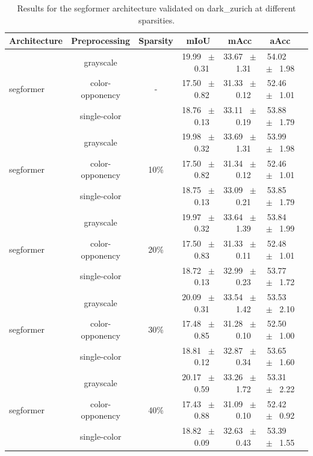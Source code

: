 \begin{table}[h]
  \centering
  \caption{Results for the segformer architecture validated on dark_zurich at different sparsities.}
  \begin{tabular}{@{}lccc ccc@{}}
    \toprule
    Architecture & Preprocessing & Sparsity & mIoU & mAcc & aAcc \\
    \midrule

    \multirow{3}{*}{segformer} & grayscale & \multirow{3}{*}{-} & 19.99 ~$\pm$~ 0.31 & 33.67 ~$\pm$~ 1.31 & 54.02 ~$\pm$~ 1.98 \\
    & color-opponency &  & 17.50 ~$\pm$~ 0.82 & 31.33 ~$\pm$~ 0.12 & 52.46 ~$\pm$~ 1.01 \\
    & single-color &  & 18.76 ~$\pm$~ 0.13 & 33.11 ~$\pm$~ 0.19 & 53.88 ~$\pm$~ 1.79 \\
    \midrule
    \multirow{3}{*}{segformer} & grayscale & \multirow{3}{*}{10\%} & 19.98 ~$\pm$~ 0.32 & 33.69 ~$\pm$~ 1.31 & 53.99 ~$\pm$~ 1.98 \\
    & color-opponency &  & 17.50 ~$\pm$~ 0.82 & 31.34 ~$\pm$~ 0.12 & 52.46 ~$\pm$~ 1.01 \\
    & single-color &  & 18.75 ~$\pm$~ 0.13 & 33.09 ~$\pm$~ 0.21 & 53.85 ~$\pm$~ 1.79 \\
    \midrule
    \multirow{3}{*}{segformer} & grayscale & \multirow{3}{*}{20\%} & 19.97 ~$\pm$~ 0.32 & 33.64 ~$\pm$~ 1.39 & 53.84 ~$\pm$~ 1.99 \\
    & color-opponency &  & 17.50 ~$\pm$~ 0.83 & 31.33 ~$\pm$~ 0.11 & 52.48 ~$\pm$~ 1.01 \\
    & single-color &  & 18.72 ~$\pm$~ 0.13 & 32.99 ~$\pm$~ 0.23 & 53.77 ~$\pm$~ 1.72 \\
    \midrule
    \multirow{3}{*}{segformer} & grayscale & \multirow{3}{*}{30\%} & 20.09 ~$\pm$~ 0.31 & 33.54 ~$\pm$~ 1.42 & 53.53 ~$\pm$~ 2.10 \\
    & color-opponency &  & 17.48 ~$\pm$~ 0.85 & 31.28 ~$\pm$~ 0.10 & 52.50 ~$\pm$~ 1.00 \\
    & single-color &  & 18.81 ~$\pm$~ 0.12 & 32.87 ~$\pm$~ 0.34 & 53.65 ~$\pm$~ 1.60 \\
    \midrule
    \multirow{3}{*}{segformer} & grayscale & \multirow{3}{*}{40\%} & 20.17 ~$\pm$~ 0.59 & 33.26 ~$\pm$~ 1.72 & 53.31 ~$\pm$~ 2.22 \\
    & color-opponency &  & 17.43 ~$\pm$~ 0.88 & 31.09 ~$\pm$~ 0.10 & 52.42 ~$\pm$~ 0.92 \\
    & single-color &  & 18.82 ~$\pm$~ 0.09 & 32.63 ~$\pm$~ 0.43 & 53.39 ~$\pm$~ 1.55 \\

\end{tabular}
\end{table}
